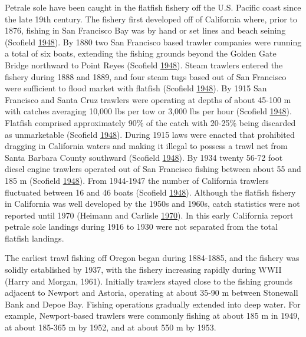 \documentclass[12pt,]{article}
\begin{document}
Petrale sole have been caught in the flatfish fishery off the U.S.
Pacific coast since the late 19th century. The fishery first developed
off of California where, prior to 1876, fishing in San Francisco Bay was
by hand or set lines and beach seining (Scofield
\protect\hyperlink{ref-scofield_trawling_1948}{1948}). By 1880 two San
Francisco based trawler companies were running a total of six boats,
extending the fishing grounds beyond the Golden Gate Bridge northward to
Point Reyes (Scofield
\protect\hyperlink{ref-scofield_trawling_1948}{1948}). Steam trawlers
entered the fishery during 1888 and 1889, and four steam tugs based out
of San Francisco were sufficient to flood market with flatfish (Scofield
\protect\hyperlink{ref-scofield_trawling_1948}{1948}). By 1915 San
Francisco and Santa Cruz trawlers were operating at depths of about
45-100 m with catches averaging 10,000 lbs per tow or 3,000 lbs per hour
(Scofield \protect\hyperlink{ref-scofield_trawling_1948}{1948}).
Flatfish comprised approximately 90\% of the catch with 20-25\% being
discarded as unmarketable (Scofield
\protect\hyperlink{ref-scofield_trawling_1948}{1948}). During 1915 laws
were enacted that prohibited dragging in California waters and making it
illegal to possess a trawl net from Santa Barbara County southward
(Scofield \protect\hyperlink{ref-scofield_trawling_1948}{1948}). By 1934
twenty 56-72 foot diesel engine trawlers operated out of San Francisco
fishing between about 55 and 185 m (Scofield
\protect\hyperlink{ref-scofield_trawling_1948}{1948}). From 1944-1947
the number of California trawlers fluctuated between 16 and 46 boats
(Scofield \protect\hyperlink{ref-scofield_trawling_1948}{1948}).
Although the flatfish fishery in California was well developed by the
1950s and 1960s, catch statistics were not reported until 1970 (Heimann
and Carlisle \protect\hyperlink{ref-heimann_pacific_1970}{1970}). In
this early California report petrale sole landings during 1916 to 1930
were not separated from the total flatfish landings.

The earliest trawl fishing off Oregon began during 1884-1885, and the
fishery was solidly established by 1937, with the fishery increasing
rapidly during WWII (Harry and Morgan, 1961). Initially trawlers stayed
close to the fishing grounds adjacent to Newport and Astoria, operating
at about 35-90 m between Stonewall Bank and Depoe Bay. Fishing
operations gradually extended into deep water. For example,
Newport-based trawlers were commonly fishing at about 185 m in 1949, at
about 185-365 m by 1952, and at about 550 m by 1953.
\end{document}
